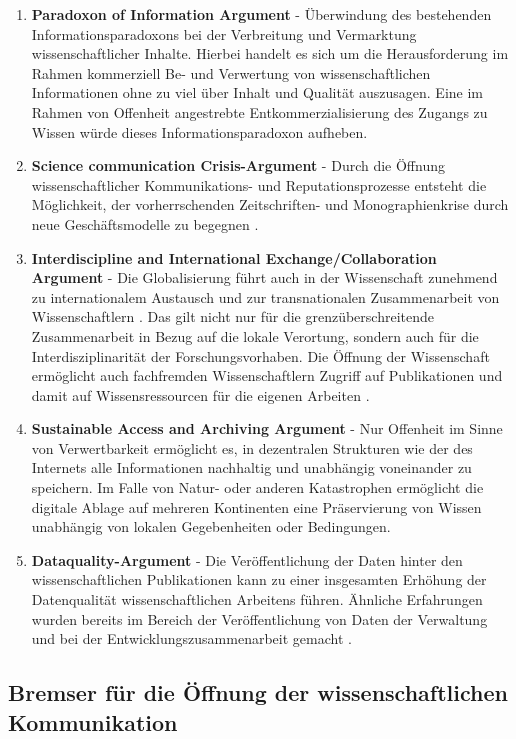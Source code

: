 \begin{enumerate}
\item \textbf{Paradoxon of Information Argument} - Überwindung des bestehenden Informationsparadoxons bei der Verbreitung und Vermarktung wissenschaftlicher Inhalte. Hierbei handelt es sich um die Herausforderung im Rahmen kommerziell Be- und Verwertung von wissenschaftlichen Informationen ohne zu viel über Inhalt und Qualität auszusagen. Eine im Rahmen von Offenheit angestrebte Entkommerzialisierung des Zugangs zu Wissen würde dieses Informationsparadoxon aufheben.
\item \textbf{Science communication Crisis-Argument} - Durch die Öffnung wissenschaftlicher Kommunikations- und Reputationsprozesse entsteht die Möglichkeit, der vorherrschenden Zeitschriften- und Monographienkrise durch neue Geschäftsmodelle zu begegnen \cite{muller_2010_open} \cite{naeder_2010_open}.
\item \textbf{Interdiscipline and International Exchange/Collaboration Argument} - Die Globalisierung führt auch in der Wissenschaft zunehmend zu internationalem Austausch und zur transnationalen Zusammenarbeit von Wissenschaftlern \cite{Waltman_2011}. Das gilt nicht nur für die grenzüberschreitende Zusammenarbeit in Bezug auf die lokale Verortung, sondern auch für die Interdisziplinarität der Forschungsvorhaben. Die Öffnung der Wissenschaft ermöglicht auch fachfremden Wissenschaftlern Zugriff auf Publikationen und damit auf Wissensressourcen für die eigenen Arbeiten \cite{suchen}.
\item \textbf{Sustainable Access and Archiving Argument} - Nur Offenheit im Sinne von Verwertbarkeit ermöglicht es, in dezentralen Strukturen wie der des Internets alle Informationen nachhaltig und unabhängig voneinander zu speichern. Im Falle von Natur- oder anderen Katastrophen ermöglicht die digitale Ablage auf mehreren Kontinenten eine Präservierung von Wissen unabhängig von lokalen Gegebenheiten oder Bedingungen.
\item \textbf{Dataquality-Argument} - Die Veröffentlichung der Daten hinter den wissenschaftlichen Publikationen kann zu einer insgesamten Erhöhung der Datenqualität wissenschaftlichen Arbeitens führen. Ähnliche Erfahrungen wurden bereits im Bereich der Veröffentlichung von Daten der Verwaltung und bei der Entwicklungszusammenarbeit gemacht \cite{heise_2014_bundestag}.
\end{enumerate}

\subsection{Bremser für die Öffnung der wissenschaftlichen Kommunikation}

